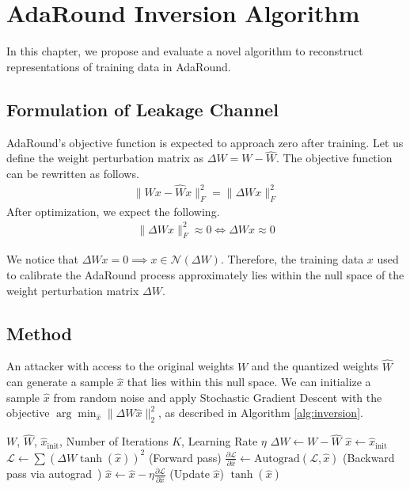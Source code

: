 \documentclass[../main.tex]{subfiles}
\begin{document}
\chapter{AdaRound Inversion Algorithm} \label{chap:adaround_inversion}
In this chapter, we propose and evaluate a novel algorithm to reconstruct representations of training data in AdaRound.

\section{Formulation of Leakage Channel}
AdaRound's objective function is expected to approach zero after training. Let us define the weight perturbation matrix as $\Delta W = W - \hat{W}$. The objective function can be rewritten as follows.
\begin{align}
\|Wx - \hat{W}x\|_F^2 = \|\Delta W x\|_F^2
\end{align}
After optimization, we expect the following.
\begin{align}
\|\Delta W x\|_F^2 \approx 0 \iff \Delta W x \approx 0
\end{align}

We notice that $\Delta W x = 0 \implies x \in \mathcal{N}(\Delta W)$. Therefore, the training data $x$ used to calibrate the AdaRound process approximately lies within the null space of the weight perturbation matrix $\Delta W$. 

\section{Method}
An attacker with access to the original weights $W$ and the quantized weights $\hat{W}$ can generate a sample $\hat{x}$ that lies within this null space. We can initialize a sample $\hat{x}$ from random noise and apply Stochastic Gradient Descent with the objective $\arg\min_{\hat{x}} \|\Delta W \hat{x}\|_2^2$, as described in Algorithm \ref{alg:inversion}.

\begin{algorithm}[H]
\caption{Proposed Inversion Method}\label{alg:inversion}
\begin{algorithmic}[1]
\Require $W$, $\hat{W}$, $\hat{x}_{\text{init}}$, Number of Iterations $K$, Learning Rate $\eta$
\State $\Delta W \gets W - \hat{W}$
\State $\hat{x} \gets \hat{x}_\text{init}$
    \State $\mathcal{L}  \gets \sum \left( \Delta W  \tanh(\hat{x}) \right)^2$ (Forward pass)
    \State $\frac{\partial \mathcal{L}}{\partial \hat{x}} \gets \text{Autograd}(\mathcal{L}, \hat{x})$ (Backward pass via autograd~\cite{paszkePyTorchImperativeStyle2019})
    \State $\hat{x} \gets \hat{x} - \eta \frac{\partial\mathcal{L}}{\partial{\hat{x}}}$ (Update $\hat{x}$)
\EndFor
\State \Return $\tanh(\hat{x})$
\end{algorithmic}
\end{algorithm}
\end{document}
